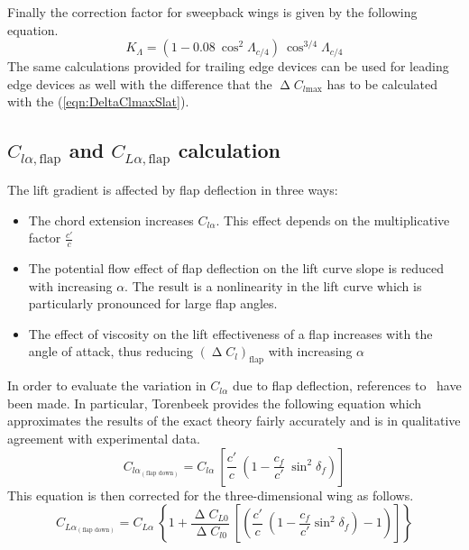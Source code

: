 \bigskip
\noindent
Finally the correction factor for sweepback wings is given by the following equation.
%
\begin{equation}
K_\Lambda=\left(1-0.08\ \cos^2\Lambda_{c/4}\right)\ \cos^{3/4}\Lambda_{c/4}
\label{eqn:KLambda}
\end{equation}
%
\noindent
The same calculations provided for trailing edge devices can be used for leading edge devices as well with the difference that the $\upDelta C_{l\text{max}}$ has to be calculated with the (\ref{eqn:DeltaClmaxSlat}). 
%
\subsection{$C_{l\alpha, \text{flap}}$ and  $C_{L\alpha, \text{flap}}$ calculation}
The lift gradient is affected by flap deflection in three ways:
%
\begin{itemize}
\item The chord extension increases $C_{l\alpha}$. This effect depends on the multiplicative factor $\frac{c'}{c}$
\item The potential flow effect of flap deflection on the lift curve slope is reduced with increasing $\alpha$. The result is a nonlinearity in the lift curve which is particularly pronounced for large flap angles.
\item The effect of viscosity on the lift effectiveness of a flap increases with the angle of attack, thus reducing $\left(\upDelta C_{l}\right)_{\text{flap}}$ with increasing $\alpha$
\end{itemize}
%
\noindent
In order to evaluate the variation in $C_{l\alpha}$ due to flap deflection, references to~\cite{torenbeek1982synthesis} have been made. In particular, Torenbeek provides the following equation which approximates the results of the exact theory fairly accurately and is in qualitative agreement with experimental data. 
%
\begin{equation}
C_{l\alpha_{\left(\text{flap down}\right)}}=C_{l\alpha}\ \left[\dfrac{c'}{c}\ \left(1-\dfrac{c_f}{c'}\ \sin^2\delta_f\right)\right]
\label{eqn:ClalphaFlap}
\end{equation}
%
\noindent
This equation is then corrected for the three-dimensional wing as follows.
%
\begin{equation}
C_{L\alpha_{\left(\text{flap down}\right)}}=C_{L\alpha}\ \left\{1+\dfrac{\upDelta C_{L0}}{\upDelta C_{l0}}\ \left[\left(\dfrac{c'}{c}\ \left(1-\dfrac{c_f}{c'}\sin^2\delta_f\right)-1\right)\right]\right\}
\label{eqn:ClalphaFlap}
\end{equation}
%
